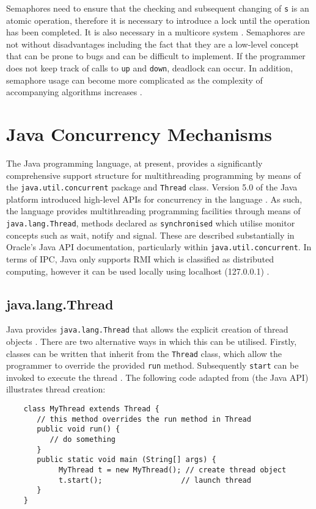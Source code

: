 \documentclass[12pt,a4paper,oneside]{article}
\def\code#1{\texttt{#1}}
\begin{document}
    Semaphores need to ensure that the checking and subsequent changing of \code{s} is an atomic operation, therefore it is necessary to introduce a lock until the operation has been completed. It is also necessary in a multicore system \citep{modernOS}. Semaphores are not without disadvantages including the fact that they are a low-level concept that can be prone to bugs and can be difficult to implement. If the programmer does not keep track of calls to \code{up} and \code{down}, deadlock can occur. In addition, semaphore usage can become more complicated as the complexity of accompanying algorithms increases \citep{semDisadvantages}.

\section{Java Concurrency Mechanisms}
  The Java programming language, at present, provides a significantly comprehensive support structure for multithreading programming by means of the \code{java.util.concurrent} package and \code{Thread} class. Version 5.0 of the Java platform introduced high-level APIs for concurrency in the language \citep{JavaAPI}. As such, the language provides multithreading programming facilities through means of \code{java.lang.Thread}, methods declared as \code{synchronised} which utilise monitor concepts such as wait, notify and signal. These are described substantially in Oracle's Java API documentation, particularly within \code{java.util.concurrent}. In terms of IPC, Java only supports RMI which is classified as distributed computing, however it can be used locally using localhost (127.0.0.1) \citep{WellsIPCJava}.

  \subsection{java.lang.Thread}
    Java provides \code{java.lang.Thread} that allows the explicit creation of thread objects \citep{garg2005concurrent}. There are two alternative ways in which this can be utilised. Firstly, classes can be written that inherit from the \code{Thread} class, which allow the programmer to override the provided \code{run} method. Subsequently \code{start{}} can be invoked to execute the thread \citep{garg2005concurrent}. The following code adapted from \cite{JavaAPI} (the Java API) illustrates thread creation:
    \begin{verbatim}
    class MyThread extends Thread {
       // this method overrides the run method in Thread
       public void run() {
          // do something
       }
       public static void main (String[] args) {
            MyThread t = new MyThread(); // create thread object
            t.start();					// launch thread
       }
    }
    \end{verbatim}
\end{document}
